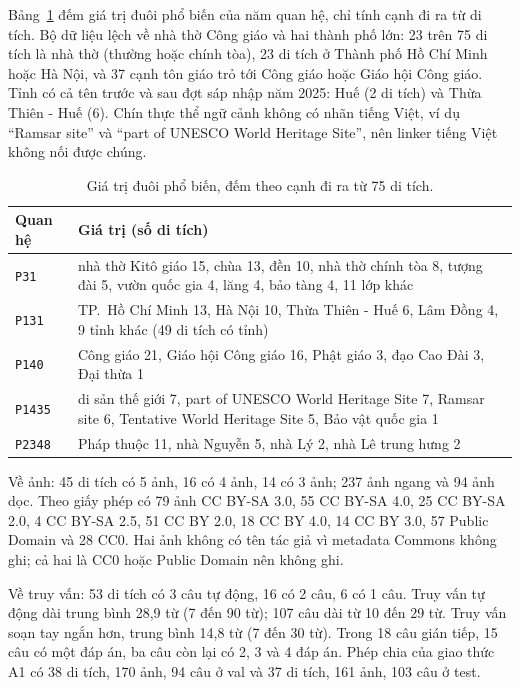 Bảng~\ref{tab:app-values} đếm giá trị đuôi phổ biến của năm quan hệ, chỉ tính cạnh đi ra từ di tích. Bộ dữ liệu
lệch về nhà thờ Công giáo và hai thành phố lớn: 23 trên 75 di tích là nhà thờ (thường hoặc chính tòa), 23 di tích ở
Thành phố Hồ Chí Minh hoặc Hà Nội, và 37 cạnh tôn giáo trỏ tới Công giáo hoặc Giáo hội Công giáo. Tỉnh có cả tên
trước và sau đợt sáp nhập năm 2025: Huế (2 di tích) và Thừa Thiên - Huế (6). Chín thực thể ngữ cảnh không có nhãn
tiếng Việt, ví dụ ``Ramsar site'' và ``part of UNESCO World Heritage Site'', nên linker tiếng Việt không nối được
chúng.

\begin{table}[!htb]
\centering
\caption{Giá trị đuôi phổ biến, đếm theo cạnh đi ra từ 75 di tích.}
\label{tab:app-values}
\scriptsize
\setlength{\tabcolsep}{3pt}
\begin{tabular}{@{}l>{\raggedright\arraybackslash}p{6.6cm}@{}}
\toprule
Quan hệ & Giá trị (số di tích) \\
\midrule
\texttt{P31} & nhà thờ Kitô giáo 15, chùa 13, đền 10, nhà thờ chính tòa 8, tượng đài 5, vườn quốc gia 4, lăng 4,
bảo tàng 4, 11 lớp khác \\
\texttt{P131} & TP.~Hồ Chí Minh 13, Hà Nội 10, Thừa Thiên - Huế 6, Lâm Đồng 4, 9 tỉnh khác (49 di tích có tỉnh) \\
\texttt{P140} & Công giáo 21, Giáo hội Công giáo 16, Phật giáo 3, đạo Cao Đài 3, Đại thừa 1 \\
\texttt{P1435} & di sản thế giới 7, part of UNESCO World Heritage Site 7, Ramsar site 6, Tentative World Heritage
Site 5, Bảo vật quốc gia 1 \\
\texttt{P2348} & Pháp thuộc 11, nhà Nguyễn 5, nhà Lý 2, nhà Lê trung hưng 2 \\
\bottomrule
\end{tabular}
\end{table}

Về ảnh: 45 di tích có 5 ảnh, 16 có 4 ảnh, 14 có 3 ảnh; 237 ảnh ngang và 94 ảnh dọc. Theo giấy phép có 79 ảnh CC
BY-SA 3.0, 55 CC BY-SA 4.0, 25 CC BY-SA 2.0, 4 CC BY-SA 2.5, 51 CC BY 2.0, 18 CC BY 4.0, 14 CC BY 3.0, 57 Public
Domain và 28 CC0. Hai ảnh không có tên tác giả vì metadata Commons không ghi; cả hai là CC0 hoặc Public Domain nên
không ghi.

Về truy vấn: 53 di tích có 3 câu tự động, 16 có 2 câu, 6 có 1 câu. Truy vấn tự động dài trung bình 28,9 từ (7 đến
90 từ); 107 câu dài từ 10 đến 29 từ. Truy vấn soạn tay ngắn hơn, trung bình 14,8 từ (7 đến 30 từ). Trong 18 câu gián
tiếp, 15 câu có một đáp án, ba câu còn lại có 2, 3 và 4 đáp án. Phép chia của giao thức A1 có 38 di tích, 170 ảnh,
94 câu ở val và 37 di tích, 161 ảnh, 103 câu ở test.

